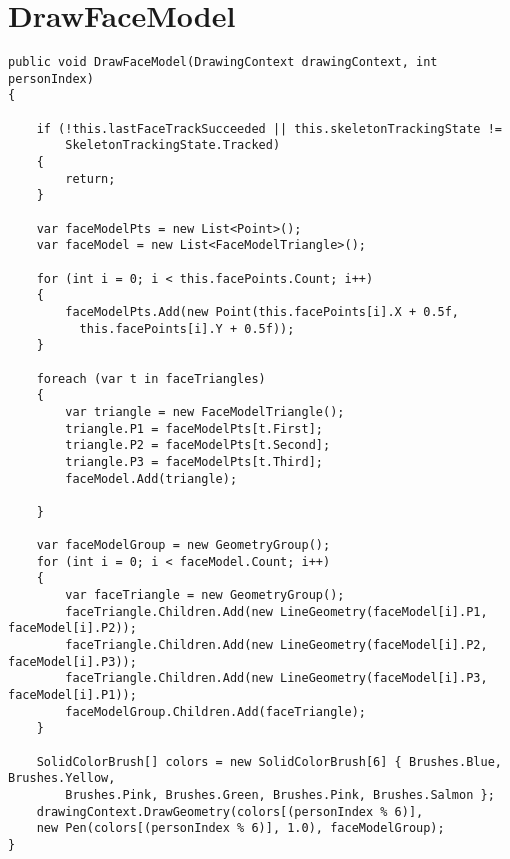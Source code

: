 \onecolumn
\section{DrawFaceModel}\label{sec:apendiceA}
\begin{verbatim}
public void DrawFaceModel(DrawingContext drawingContext, int personIndex)
{

    if (!this.lastFaceTrackSucceeded || this.skeletonTrackingState != 
        SkeletonTrackingState.Tracked)
    {
        return;
    }

    var faceModelPts = new List<Point>();
    var faceModel = new List<FaceModelTriangle>();

    for (int i = 0; i < this.facePoints.Count; i++)
    {
        faceModelPts.Add(new Point(this.facePoints[i].X + 0.5f, 
          this.facePoints[i].Y + 0.5f));
    }

    foreach (var t in faceTriangles)
    {
        var triangle = new FaceModelTriangle();
        triangle.P1 = faceModelPts[t.First];
        triangle.P2 = faceModelPts[t.Second];
        triangle.P3 = faceModelPts[t.Third];
        faceModel.Add(triangle);

    }

    var faceModelGroup = new GeometryGroup();
    for (int i = 0; i < faceModel.Count; i++)
    {
        var faceTriangle = new GeometryGroup();
        faceTriangle.Children.Add(new LineGeometry(faceModel[i].P1, faceModel[i].P2));
        faceTriangle.Children.Add(new LineGeometry(faceModel[i].P2, faceModel[i].P3));
        faceTriangle.Children.Add(new LineGeometry(faceModel[i].P3, faceModel[i].P1));
        faceModelGroup.Children.Add(faceTriangle);
    }

    SolidColorBrush[] colors = new SolidColorBrush[6] { Brushes.Blue, Brushes.Yellow, 
        Brushes.Pink, Brushes.Green, Brushes.Pink, Brushes.Salmon };
    drawingContext.DrawGeometry(colors[(personIndex % 6)], 
    new Pen(colors[(personIndex % 6)], 1.0), faceModelGroup);
}
\end{verbatim}
